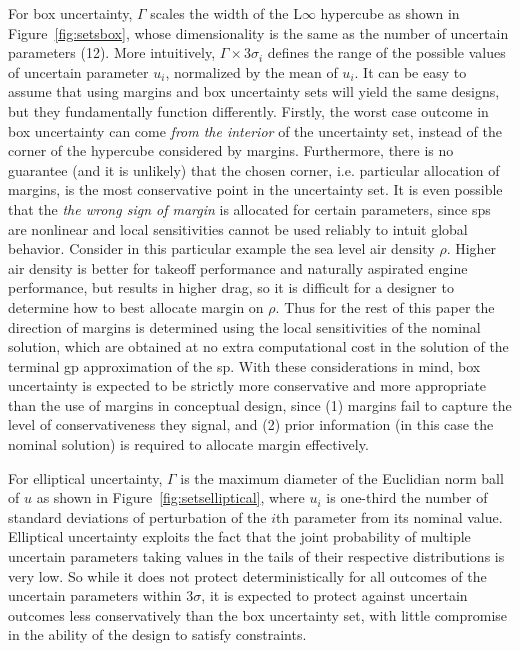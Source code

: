 For box uncertainty,
$\Gamma$ scales the width of the L$\infty$ hypercube as shown in Figure~\ref{fig:setsbox},
whose dimensionality is the same as the number of uncertain parameters (12).
More intuitively, $\Gamma \times 3\sigma_i$ defines the range of the possible values of uncertain parameter $u_i$,
normalized by the mean of $u_i$.
It can be easy to assume that using margins and box uncertainty sets will yield the same designs,
but they fundamentally function differently.
Firstly, the worst case outcome in box uncertainty can come \emph{from the interior} of the uncertainty
set, instead of the corner of the hypercube considered
by margins. Furthermore, there is no guarantee (and it is unlikely)
that the chosen corner, i.e. particular allocation of margins,
is the most conservative point in the uncertainty set.
It is even possible that the \emph{the wrong sign of margin} is allocated for certain parameters,
since \gls{sp}s are nonlinear and local sensitivities cannot be used reliably to intuit global behavior. {\color{blue}Consider
in this particular example the sea level air density $\rho$.
Higher air density is better for takeoff performance and naturally aspirated engine performance,
but results in higher drag, so it is difficult
for a designer to determine how to best allocate margin on $\rho$.} Thus for the rest
of this paper the direction of margins is determined using the local sensitivities of the nominal solution,
which are obtained at no extra computational cost in the solution of the terminal \gls{gp} approximation of the \gls{sp}.
With these considerations in mind, box uncertainty is expected to be strictly more conservative
and more appropriate than the use of margins
in conceptual design, since (1) margins fail to capture the level of conservativeness they signal, and (2) prior
information (in this case the nominal solution) is required to allocate margin effectively.

For elliptical uncertainty, $\Gamma$ is the maximum diameter of the Euclidian norm
ball of $u$ as shown in Figure~\ref{fig:setselliptical},
where $u_i$ is {\color{blue}one-third} the number of standard deviations of perturbation of the
$i$th parameter from its nominal value.
Elliptical uncertainty exploits the fact that the joint probability of
multiple uncertain parameters taking values in the tails of their respective distributions is
very low. So while it does not protect deterministically for all outcomes of the uncertain
parameters within $3\sigma$, it is expected to protect against uncertain outcomes
less conservatively than the box uncertainty set, with little compromise in the
ability of the design to satisfy constraints.
